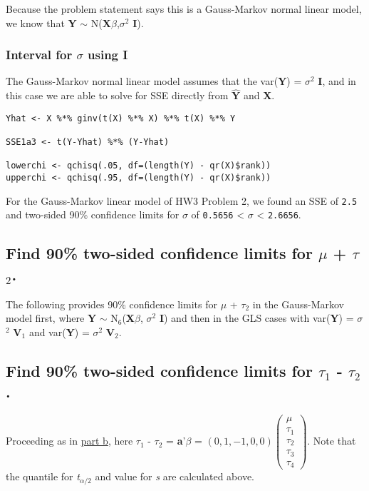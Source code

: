\documentclass[11pt]{article}
\begin{document}
Because the problem statement says this is a Gauss-Markov normal
linear model, we know that \textbf{Y} $\sim$ N(\textbf{X$\beta$},$\sigma$$^2$ \textbf{I}).
\subsubsection{Interval for $\sigma$ using \textbf{I}}
\label{sec-1-1-1}

The Gauss-Markov normal linear model assumes that the var(\textbf{Y}) =
$\sigma$$^2$ \textbf{I}, and in this case we are able to solve for SSE directly
from $\mathbf{\hat{Y}}$ and \textbf{X}.


\begin{verbatim}
Yhat <- X %*% ginv(t(X) %*% X) %*% t(X) %*% Y

SSE1a3 <- t(Y-Yhat) %*% (Y-Yhat)

lowerchi <- qchisq(.05, df=(length(Y) - qr(X)$rank))
upperchi <- qchisq(.95, df=(length(Y) - qr(X)$rank))
\end{verbatim}

For the Gauss-Markov linear model of HW3 Problem 2, we found an SSE of \texttt{2.5} and two-sided 90\% confidence
limits for $\sigma$ of \texttt{0.5656} <
$\sigma$ < \texttt{2.6656}.
\subsection{Find 90\% two-sided confidence limits for $\mu$ + $\tau$$_2$.}
\label{sec-1-2}
\label{MuTau2}

The following provides 90\% confidence limits for $\mu$ + $\tau$$_2$ in the
Gauss-Markov model first, where \textbf{Y} $\sim$ N$_6$(\textbf{X$\beta$}, $\sigma$$^2$ \textbf{I}) and then in the GLS cases with var(\textbf{Y}) =
$\sigma$$^2$ \textbf{V$_1$} and var(\textbf{Y}) = $\sigma$$^2$ \textbf{V$_2$}.
\subsection{Find 90\% two-sided confidence limits for $\tau$$_1$ - $\tau$$_2$.}
\label{sec-1-3}
\label{Tau1Tau2}

Proceeding as in \hyperref[MuTau2]{part b}, here $\tau$$_1$ - $\tau$$_2$ = \textbf{a}'\textbf{$\beta$} = $(0, 1, -1,
0, 0) \begin{pmatrix} \mu \\ \tau_1 \\ \tau_2
\\ \tau_3 \\ \tau_4 \end{pmatrix}$. Note that the quantile for
\emph{t$_{\alpha/2}$} and value for \emph{s} are calculated above.
\end{document}
